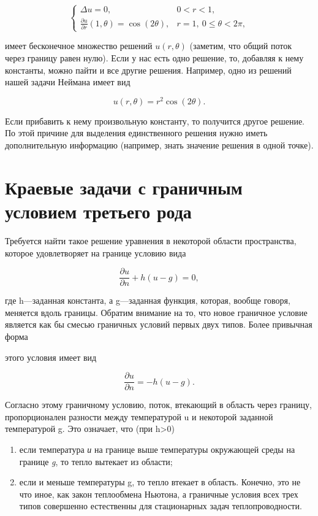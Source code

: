 \documentclass[
  ukrainian,
]{article}
\begin{document}
\[
\begin{cases} \Delta u = 0, & 0 < r < 1, \\ \frac{\partial u}{\partial r}(1, \theta) = \cos(2\theta), & r = 1,\ 0 \le \theta < 2\pi, \end{cases}
\]

имеет бесконечное множество решений \(u(r,\theta)\) (заметим, что общий
поток через границу равен нулю). Если у нас есть одно решение, то,
добавляя к нему константы, можно пайти и все другие решения. Например,
одно из решений нашей задачи Неймана имеет вид

\[
u(r,\theta)=r^2\cos{(2\theta)}.
\]

Если прибавить к нему произвольную константу, то получится другое
решение. По этой причине для выделения единственного решения нужно иметь
дополнительную информацию (например, знать значение решения в одной
точке).

\section{\texorpdfstring{\textbf{Краевые задачи с граничным условием}
третьего
рода}{Краевые задачи с граничным условием третьего рода}}\label{ux43aux440ux430ux435ux432ux44bux435-ux437ux430ux434ux430ux447ux438-ux441-ux433ux440ux430ux43dux438ux447ux43dux44bux43c-ux443ux441ux43bux43eux432ux438ux435ux43c-ux442ux440ux435ux442ux44cux435ux433ux43e-ux440ux43eux434ux430}

Требуется найти такое решение уравнения в некоторой области
пространства, которое удовлетворяет на границе условию вида

\[
\frac{\partial u}{\partial n} + h (u - g) = 0,
\]

где h---заданная константа, а g---заданная функция, которая, вообще
говоря, меняется вдоль границы. Обратим внимание на то, что новое
граничное условие является как бы смесью граничных условий первых двух
типов. Более привычная форма

этого условия имеет вид

\[
\frac{\partial u}{\partial n} = -h (u - g).
\]

Согласно этому граничному условию, поток, втекающий в область через
границу, пропорционален разности между температурой u и некоторой
заданной температурой g. Это означает, что (при h\textgreater0)

\begin{enumerate}
\def\labelenumi{\arabic{enumi})}
\item
  если температура \emph{и} на границе выше температуры окружающей среды
  на границе \emph{g}, то тепло вытекает из области;
\item
  если и меньше температуры g, то тепло втекает в область. Конечно, это
  не что иное, как закон теплообмена Ньютона, а граничные условия всех
  трех типов совершенно естественны для стационарных задач
  теплопроводности.
\end{enumerate}
\end{document}
